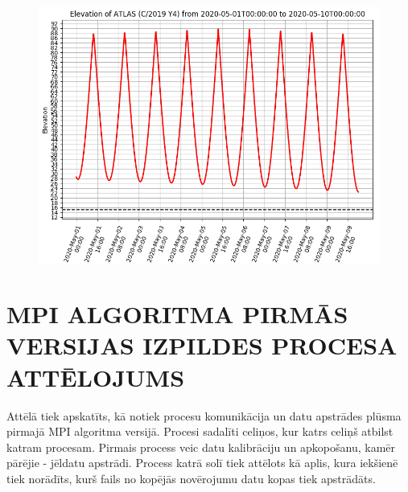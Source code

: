 \documentclass[12pt,paper=a4]{report}
\newcounter{nofappendices}
\begin{document}
\begin{figure}[H]
\centering
\includegraphics[width=\textwidth]{images/created/atlas-visibility.png}
\label{fig:atlas-visibility}
\end{figure}







\addtocounter{nofappendices}{1}
\label{appendix:tituldati}
%
%

\chapter{MPI ALGORITMA PIRMĀS VERSIJAS IZPILDES PROCESA ATTĒLOJUMS}

Attēlā tiek apskatīts, kā notiek procesu komunikācija un datu apstrādes plūsma pirmajā MPI algoritma versijā. Procesi sadalīti celiņos, kur katrs celiņš atbilst katram procesam. Pirmais process veic datu kalibrāciju un apkopošanu, kamēr pārējie - jēldatu apstrādi. Process katrā solī tiek attēlots kā aplis, kura iekšienē tiek norādīts, kurš fails no kopējās novērojumu datu kopas tiek apstrādāts. 
\end{document}
